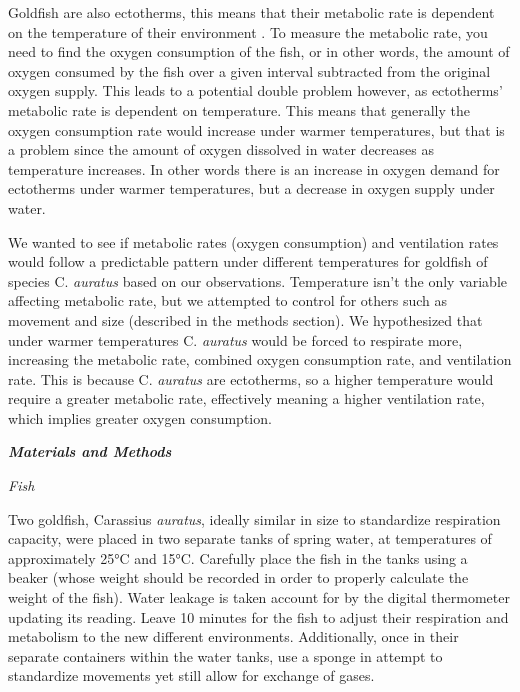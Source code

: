 \documentclass[11pt]{article}
\newcommand\sectiontitle[1]{\huge{\textit{\textbf{ #1 }}}}
\newcommand\spacer[1][5px]{\vspace{#1}}
\begin{document}
\spacer

{ \normalsize Goldfish are also ectotherms, this means that their metabolic rate is dependent on the temperature of their environment \cite{john}. To measure the metabolic rate, you need to find the oxygen consumption of the fish, or in other words,  the amount of oxygen consumed by the fish over a given interval subtracted from the original oxygen supply. This leads to a potential double problem however, as ectotherms’ metabolic rate is dependent on temperature. This means that generally the oxygen consumption rate would increase under warmer temperatures, but that is a problem since the amount of oxygen dissolved in water decreases as temperature increases. In other words there is an increase in oxygen demand for ectotherms under warmer temperatures, but a decrease in oxygen supply under water. }

\spacer

{\normalsize We wanted to see if metabolic rates (oxygen consumption) and ventilation rates would follow a predictable pattern under different temperatures for goldfish of species C. \textit{auratus} based on our observations. Temperature isn’t the only variable affecting metabolic rate, but we attempted to control for others such as movement and size (described in the methods section). We hypothesized that under warmer temperatures C. \textit{auratus} would be forced to respirate more, increasing the metabolic rate, combined oxygen consumption rate, and ventilation rate. This is because C. \textit{auratus} are ectotherms, so a higher temperature would require a greater metabolic rate, effectively meaning a higher ventilation rate, which implies greater oxygen consumption. }

\spacer\spacer

\sectiontitle{Materials and Methods}

\spacer

\textit{\Large{Fish}}

\spacer

{\normalsize Two goldfish, Carassius \textit{auratus}, ideally similar in size to standardize respiration capacity, were placed in two separate tanks of spring water, at temperatures of approximately 25°C and 15°C. Carefully place the fish in the tanks using a beaker (whose weight should be recorded in order to properly calculate the weight of the fish). Water leakage is taken account for by the digital thermometer updating its reading. Leave 10 minutes for the fish to adjust their respiration and metabolism to the new different environments. Additionally, once in their separate containers within the water tanks, use a sponge in attempt to standardize movements yet still allow for exchange of gases. }
\end{document}
